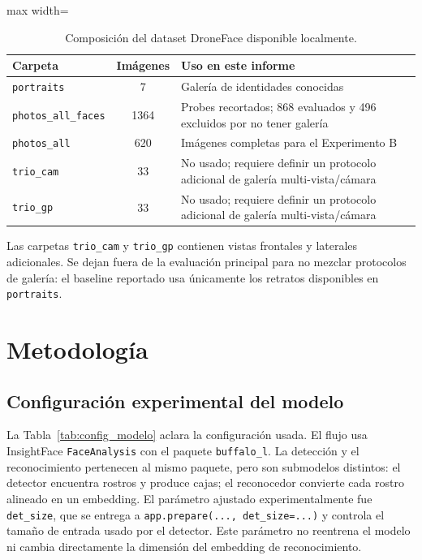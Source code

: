 \documentclass[11pt]{article}
\begin{document}
\begin{table}[H]
\centering
\caption{Composición del dataset DroneFace disponible localmente.}
\label{tab:dataset_local}
\begin{adjustbox}{max width=\textwidth}
\begin{tabular}{lcl}
\toprule
Carpeta & Imágenes & Uso en este informe \\
\midrule
\texttt{portraits} & 7 & Galería de identidades conocidas \\
\texttt{photos\_all\_faces} & 1364 & Probes recortados; 868 evaluados y 496 excluidos por no tener galería \\
\texttt{photos\_all} & 620 & Imágenes completas para el Experimento B \\
\texttt{trio\_cam} & 33 & No usado; requiere definir un protocolo adicional de galería multi-vista/cámara \\
\texttt{trio\_gp} & 33 & No usado; requiere definir un protocolo adicional de galería multi-vista/cámara \\
\bottomrule
\end{tabular}
\end{adjustbox}
\end{table}

Las carpetas \texttt{trio\_cam} y \texttt{trio\_gp} contienen vistas frontales y laterales adicionales. Se dejan fuera de la evaluación principal para no mezclar protocolos de galería: el baseline reportado usa únicamente los retratos disponibles en \texttt{portraits}.

\section{Metodología}
\label{sec:metodologia}

\subsection{Configuración experimental del modelo}

La Tabla~\ref{tab:config_modelo} aclara la configuración usada. El flujo usa InsightFace \texttt{FaceAnalysis} con el paquete \texttt{buffalo\_l}. La detección y el reconocimiento pertenecen al mismo paquete, pero son submodelos distintos: el detector encuentra rostros y produce cajas; el reconocedor convierte cada rostro alineado en un embedding. El parámetro ajustado experimentalmente fue \texttt{det\_size}, que se entrega a \texttt{app.prepare(..., det\_size=...)} y controla el tamaño de entrada usado por el detector. Este parámetro no reentrena el modelo ni cambia directamente la dimensión del embedding de reconocimiento.
\end{document}
